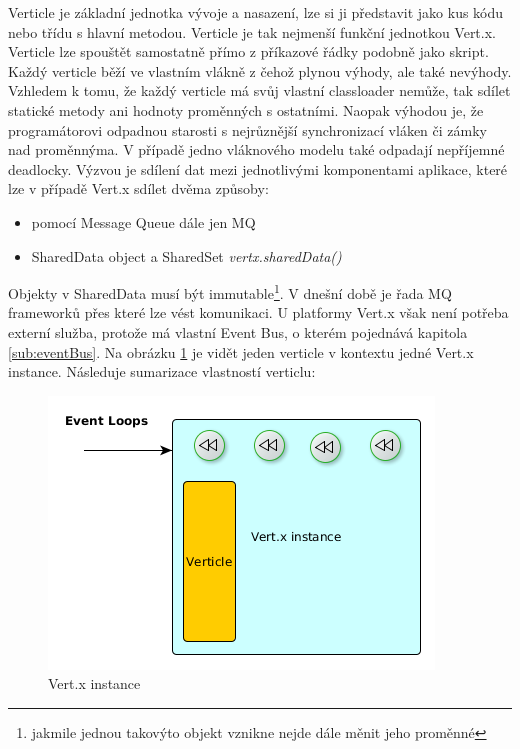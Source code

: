 Verticle je základní jednotka vývoje a nasazení, lze si ji představit jako kus kódu nebo třídu s hlavní metodou. Verticle je tak nejmenší funkční jednotkou Vert.x. Verticle lze spouštět samostatně přímo z příkazové řádky podobně jako skript. Každý verticle běží ve vlastním vlákně z čehož plynou výhody, ale také nevýhody. Vzhledem k tomu, že každý verticle má svůj vlastní classloader nemůže, tak sdílet statické metody ani hodnoty proměnných s ostatními. Naopak výhodou je, že programátorovi odpadnou starosti s nejrůznější synchronizací vláken či zámky nad proměnnýma. V případě jedno vláknového modelu také odpadají nepříjemné deadlocky. Výzvou je sdílení dat mezi jednotlivými komponentami aplikace, které lze v případě Vert.x sdílet dvěma způsoby:
\begin{itemize}
\item{pomocí Message Queue \cite{mq} dále jen MQ}
\item{SharedData object a SharedSet \emph{vertx.sharedData()}}
\end{itemize}
Objekty v SharedData musí být immutable\footnote{jakmile jednou takovýto objekt vznikne nejde dále měnit jeho proměnné}. V dnešní době je řada MQ frameworků přes které lze vést komunikaci. U platformy Vert.x však není potřeba externí služba, protože má vlastní Event Bus, o kterém pojednává kapitola \ref{sub:eventBus}. Na obrázku \ref{fig:instance} je vidět jeden verticle v kontextu jedné Vert.x instance. Následuje sumarizace vlastností verticlu:
\begin{figure}[h]
\begin{centering}
\includegraphics[scale=0.5]{obrazky/instance}
\par\end{centering}
\caption{Vert.x instance \label{fig:instance}}
\end{figure}

